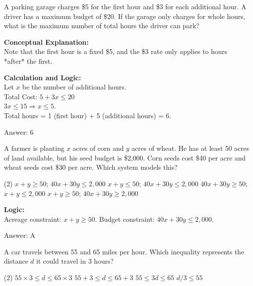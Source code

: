 \documentclass[11pt,paper=a4,answers]{exam}
\begin{document}
\begin{questions}
\question
A parking garage charges \$5 for the first hour and \$3 for each additional hour. A driver has a maximum budget of \$20. If the garage only charges for whole hours, what is the maximum number of total hours the driver can park?

\begin{solution}
\textbf{Conceptual Explanation:} \\
Note that the first hour is a fixed \$5, and the \$3 rate only applies to hours *after* the first.

\vspace{10pt}
\textbf{Calculation and Logic:} \\
Let $x$ be the number of additional hours. \\
Total Cost: $5 + 3x \le 20$ \\
$3x \le 15 \Rightarrow x \le 5$. \\
Total hours = 1 (first hour) + 5 (additional hours) = 6.

\vspace{15pt}
Answer: \colorbox{yellow!100}{6}
\end{solution}

\question
A farmer is planting $x$ acres of corn and $y$ acres of wheat. He has at least 50 acres of land available, but his seed budget is \$2,000. Corn seeds cost \$40 per acre and wheat seeds cost \$30 per acre. Which system models this?
\begin{tasks}(2)
    \task $x + y \ge 50$; $40x + 30y \le 2,000$
    \task $x + y \le 50$; $40x + 30y \le 2,000$
    \task $40x + 30y \ge 50$; $x + y \le 2,000$
    \task $x + y \ge 50$; $40x + 30y \ge 2,000$
\end{tasks}

\begin{solution}
\textbf{Logic:} \\
Acreage constraint: $x + y \ge 50$. Budget constraint: $40x + 30y \le 2,000$.

\vspace{15pt}
Answer: \colorbox{yellow!100}{A}
\end{solution}

\question
A car travels between 55 and 65 miles per hour. Which inequality represents the distance $d$ it could travel in 3 hours?
\begin{tasks}(2)
    \task $55 \times 3 \le d \le 65 \times 3$
    \task $55 + 3 \le d \le 65 + 3$
    \task $55 \le 3d \le 65$
    \task $d/3 \le 55$
\end{tasks}


\end{questions}
\end{document}
